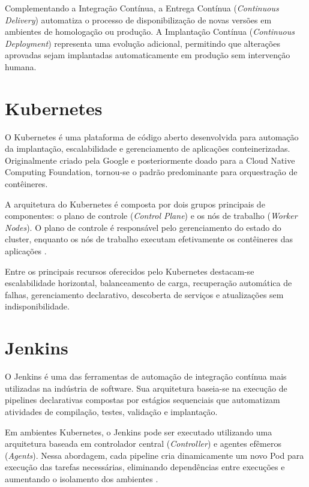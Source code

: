 Complementando a Integração Contínua, a Entrega Contínua (\textit{Continuous Delivery}) automatiza o processo de disponibilização de novas versões em ambientes de homologação ou produção. A Implantação Contínua (\textit{Continuous Deployment}) representa uma evolução adicional, permitindo que alterações aprovadas sejam implantadas automaticamente em produção sem intervenção humana.

\section{Kubernetes}
\label{sec:kubernetes}

O Kubernetes é uma plataforma de código aberto desenvolvida para automação da implantação, escalabilidade e gerenciamento de aplicações conteinerizadas. Originalmente criado pela Google e posteriormente doado para a Cloud Native Computing Foundation, tornou-se o padrão predominante para orquestração de contêineres.

A arquitetura do Kubernetes é composta por dois grupos principais de componentes: o plano de controle (\textit{Control Plane}) e os nós de trabalho (\textit{Worker Nodes}). O plano de controle é responsável pelo gerenciamento do estado do cluster, enquanto os nós de trabalho executam efetivamente os contêineres das aplicações \cite{spacelift2024,jenkinskubernetes}.

Entre os principais recursos oferecidos pelo Kubernetes destacam-se escalabilidade horizontal, balanceamento de carga, recuperação automática de falhas, gerenciamento declarativo, descoberta de serviços e atualizações sem indisponibilidade.

\section{Jenkins}
\label{sec:jenkins}

O Jenkins é uma das ferramentas de automação de integração contínua mais utilizadas na indústria de software. Sua arquitetura baseia-se na execução de pipelines declarativas compostas por estágios sequenciais que automatizam atividades de compilação, testes, validação e implantação.

Em ambientes Kubernetes, o Jenkins pode ser executado utilizando uma arquitetura baseada em controlador central (\textit{Controller}) e agentes efêmeros (\textit{Agents}). Nessa abordagem, cada pipeline cria dinamicamente um novo Pod para execução das tarefas necessárias, eliminando dependências entre execuções e aumentando o isolamento dos ambientes \cite{jenkinskubernetes,squareops2024}.

